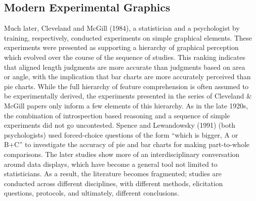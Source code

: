 \documentclass[
  10pt,
  letterpaper,
  twocolumn]{article}
\begin{document}
\subsection{Modern Experimental
Graphics}\label{modern-experimental-graphics}

Much later, Cleveland and McGill (1984), a statistician and a
psychologist by training, respectively, conducted experiments on simple
graphical elements. These experiments were presented as supporting a
hierarchy of graphical perception which evolved over the course of the
sequence of studies. This ranking indicates that aligned length
judgments are more accurate than judgments based on area or angle, with
the implication that bar charts are more accurately perceived than pie
charts. While the full hierarchy of feature comprehension is often
assumed to be experimentally derived, the experiments presented in the
series of Cleveland \& McGill papers only inform a few elements of this
hierarchy. As in the late 1920s, the combination of introspection based
reasoning and a sequence of simple experiments did not go uncontested.
Spence and Lewandowsky (1991) (both psychologists) used forced-choice
questions of the form ``which is bigger, A or B+C'' to investigate the
accuracy of pie and bar charts for making part-to-whole comparisons. The
later studies show more of an interdisciplinary conversation around data
displays, which have become a general tool not limited to statisticians.
As a result, the literature becomes fragmented; studies are conducted
across different disciplines, with different methods, elicitation
questions, protocols, and ultimately, different conclusions.
\end{document}
